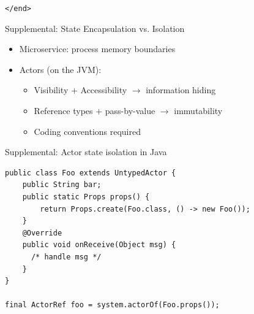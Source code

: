 \documentclass{beamer}
\begin{document}


\begin{frame}{}

\begin{center}
  \texttt{</end>}
\end{center}

\end{frame}


\begin{frame}{Supplemental: State Encapsulation vs. Isolation}

\begin{itemize}
  \item Microservice: process memory boundaries
  \item Actors (on the JVM):
  \begin{itemize}
    \item Visibility $+$ Accessibility $\rightarrow$ information hiding
    \item Reference types $+$ pass-by-value $\rightarrow$ immutability
    \item Coding conventions required
  \end{itemize}
\end{itemize}

\end{frame}


\begin{frame}[fragile]{Supplemental: Actor state isolation in Java}

\begin{verbatim}
public class Foo extends UntypedActor {
    public String bar;
    public static Props props() {
        return Props.create(Foo.class, () -> new Foo());
    }
    @Override
    public void onReceive(Object msg) { 
      /* handle msg */ 
    }
}

final ActorRef foo = system.actorOf(Foo.props());
\end{verbatim}

\end{frame}

\end{document}
